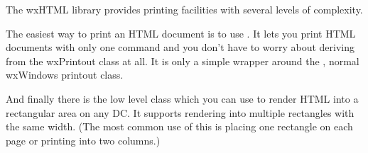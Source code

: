\label{printing}

The wxHTML library provides printing facilities with several levels of complexity. 

The easiest way to print an HTML document is to use 
. It lets you print HTML documents with only one
command and you don't have to worry about deriving from the wxPrintout class at all. It is only a simple wrapper around the 
, normal wxWindows printout class.

And finally there is the low level class  which you can use to
render HTML into a rectangular area on any DC. It supports rendering into multiple rectangles with the same
width. (The most common use of this is placing one rectangle on each page or printing into two columns.)

